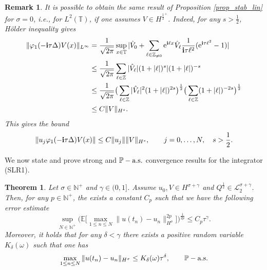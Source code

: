 \documentclass[a4paper]{amsart}
\newtheorem{theorem}{Theorem}[section]
\newtheorem{remark}{Remark}[section]
\begin{document}
\begin{remark}
\label{stab_lim_L2}
    It is possible to obtain the same result of Proposition \ref{prop_stab_lin} for $\sigma=0$, i.e., for $L^2(\mathbb{T})$, if one assumes $V\in H^{\frac{1}{2}^+}$. Indeed, for any $s>\frac{1}{2}$, Hölder inequality gives
    \begin{align*}
    \|\varphi_1(-{\bf i}\tau\Delta) V(x)\|_{L^\infty} &= \frac{1}{\sqrt{2\pi}}\displaystyle\sup_{x\in\mathbb{T}}|\hat{V}_0+\displaystyle\sum_{\ell\in\mathbb{Z}_{\ne 0}}{\rm e}^{{\bf i}\ell x} \hat{V}_\ell\frac{1}{{\bf i}\tau\ell^2}({\rm e}^{{\bf i}\tau \ell^2}-1)|\\
    &\le \frac{1}{\sqrt{2\pi}}\displaystyle\sum_{\ell\in\mathbb{Z}}|\hat{V}_{\ell}|(1+|\ell|)^{s}|(1+|\ell|)^{-s}\\
    &\le \frac{1}{\sqrt{2\pi}} \big(\displaystyle\sum_{\ell\in\mathbb{Z}}|\hat{V}_{\ell}|^2(1+|\ell|)^{2s}\big)^{\frac{1}{2}}\big(\displaystyle\sum_{\ell\in\mathbb{Z}}(1+|\ell|)^{-2s}\big)^{\frac{1}{2}}\\
    &\le C \|V\|_{H^s}.
    \end{align*}
    This gives the bound
    $$
    \|u_j \varphi_1(-{\bf i}\tau\Delta) V(x)\|\le C \|u_j\| \|V\|_{H^s},\qquad j=0,\dots,N, \quad s>\frac{1}{2}.
    $$
\end{remark}
We now state and prove strong and $\mathbb{P}-{\rm a.s.}$ convergence results for the integrator (SLR1).
\begin{theorem}
\label{conv_res_lin}
Let $\sigma \in \mathbb{N}^+$ and $\gamma\in(0,1]$. Assume $u_0, V\in H^{\sigma+\gamma}$ and $Q^{\frac{1}{2}}\in\mathcal{L}_2^{\sigma+\gamma}$.  
Then, for any $p\in\mathbb{N}^+$, the exists a constant $C_p$ such that we have the following error estimate
\begin{equation}
\label{strong_conv_lin}
\sup_{N\in\mathbb{N}^+}\big(\mathbb{E}\big[\max_{1\le n\le N}\|u(t_n)-u_n\|^{2p}_{H^\sigma}  \big]\big)^{\frac{1}{2p}} \le C_p\tau^\gamma.
\end{equation}
Moreover, it holds that for any $\delta<\gamma$ there exists a positive random variable $K_\delta(\omega)$ such that one has
    \begin{equation}
        \label{path_conv_lin}
        \max_{1\le n\le N}\|u(t_n)-u_n\|_{H^\sigma}\le K_\delta(\omega)\tau^\delta, \qquad \mathbb{P}-{\rm a.s.}
    \end{equation}
\end{theorem}
\end{document}
